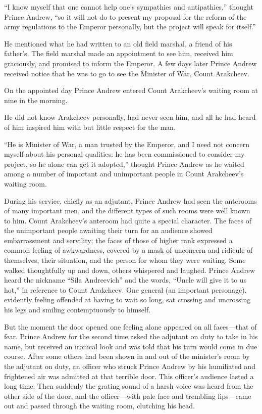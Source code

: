 ``I know myself that one cannot help one's sympathies and
antipathies,'' thought Prince Andrew, ``so it will not do to
present my proposal for the reform of the army regulations to the
Emperor personally, but the project will speak for itself.''

He mentioned what he had written to an old field marshal, a
friend of his father's. The field marshal made an appointment to
see him, received him graciously, and promised to inform the
Emperor. A few days later Prince Andrew received notice that he
was to go to see the Minister of War, Count Arakcheev.

On the appointed day Prince Andrew entered Count Arakcheev's
waiting room at nine in the morning.

He did not know Arakcheev personally, had never seen him, and all
he had heard of him inspired him with but little respect for the
man.

``He is Minister of War, a man trusted by the Emperor, and I need
not concern myself about his personal qualities: he has been
commissioned to consider my project, so he alone can get it
adopted,'' thought Prince Andrew as he waited among a number of
important and unimportant people in Count Arakcheev's waiting
room.

During his service, chiefly as an adjutant, Prince Andrew had
seen the anterooms of many important men, and the different types
of such rooms were well known to him. Count Arakcheev's anteroom
had quite a special character. The faces of the unimportant
people awaiting their turn for an audience showed embarrassment
and servility; the faces of those of higher rank expressed a
common feeling of awkwardness, covered by a mask of unconcern and
ridicule of themselves, their situation, and the person for whom
they were waiting. Some walked thoughtfully up and down, others
whispered and laughed. Prince Andrew heard the nickname ``Sila
Andreevich'' and the words, ``Uncle will give it to us hot,'' in
reference to Count Arakcheev. One general (an important
personage), evidently feeling offended at having to wait so long,
sat crossing and uncrossing his legs and smiling contemptuously
to himself.

But the moment the door opened one feeling alone appeared on all
faces---that of fear. Prince Andrew for the second time asked the
adjutant on duty to take in his name, but received an ironical
look and was told that his turn would come in due course. After
some others had been shown in and out of the minister's room by
the adjutant on duty, an officer who struck Prince Andrew by his
humiliated and frightened air was admitted at that terrible
door. This officer's audience lasted a long time. Then suddenly
the grating sound of a harsh voice was heard from the other side
of the door, and the officer---with pale face and trembling
lips---came out and passed through the waiting room, clutching
his head.

